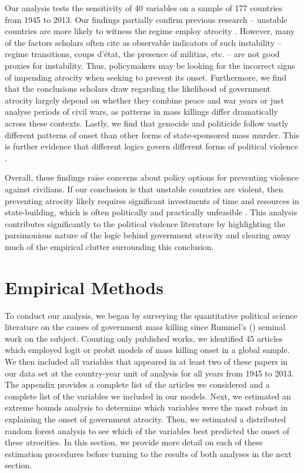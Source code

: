 \documentclass[a4paper,12pt]{article}
\begin{document}
Our analysis tests the sensitivity of 40 variables on a sample of 177 countries from 1945 to 2013. Our findings partially confirm previous research -- unstable countries are more likely to witness the regime employ atrocity \citep[e.g.,][]{goldsmith2013forecasting,harff2003no,krain1997state}. However, many of the factors scholars often cite as observable indicators of such instability -- regime transitions, coups d'état, the presence of militias, etc. -- are not good proxies for instability. Thus, policymakers may be looking for the incorrect signs of impending atrocity when seeking to prevent its onset. Furthermore, we find that the conclusions scholars draw regarding the likelihood of government atrocity largely depend on whether they combine peace and war years or just analyse periods of civil wars, as patterns in mass killings differ dramatically across these contexts. Lastly, we find that genocide and politicide follow vastly different patterns of onset than other forms of state-sponsored mass murder. This is further evidence that different logics govern different forms of political violence \citep{stanton2013terrorism}.

Overall, these findings raise concerns about policy options for preventing violence against civilians. If our conclusion is that unstable countries are violent, then preventing atrocity likely requires significant investments of time and resources in state-building, which is often politically and practically unfeasible \citep{doyle2006making}.  This analysis contributes significantly to the political violence literature by highlighting the parsimonious nature of the logic behind government atrocity and clearing away much of the empirical clutter surrounding this conclusion. 
	
\section{Empirical Methods}
\label{sec:methods}
	
To conduct our analysis, we began by surveying the quantitative political science literature on the causes of government mass killing since Rummel's (\citeyear{rummel1995democracy}) seminal work on the subject. Counting only published works, we identified 45 articles which employed logit or probit models of mass killing onset in a global sample.  We then included all variables that appeared in at least two of these papers in our data set at the country-year unit of analysis for all years from 1945 to 2013. The appendix provides a complete list of the articles we considered and a complete list of the variables we included in our models. Next, we estimated an extreme bounds analysis to determine which variables were the most robust in explaining the onset of government atrocity. Then, we estimated a distributed random forest analysis to see which of the variables best predicted the onset of these atrocities. In this section, we provide more detail on each of these estimation procedures before turning to the results of both analyses in the next section.
\end{document}
